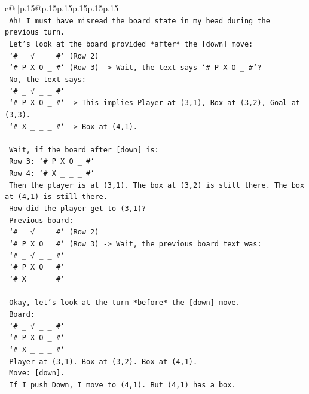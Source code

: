 \documentclass{article}
\begin{document}
{\begin{supertabular}{c@{$\;$}|p{.15\linewidth}@{}p{.15\linewidth}p{.15\linewidth}p{.15\linewidth}p{.15\linewidth}p{.15\linewidth}}
{{{\\ 
\texttt{      Ah! I must have misread the board state in my head during the previous turn.} \\
\texttt{      Let's look at the board provided *after* the {[}down{]} move:} \\
\texttt{      `\# \_ √ \_ \_ \#` (Row 2)} \\
\texttt{      `\# P X O \_ \#` (Row 3) {-}> Wait, the text says `\# P X O \_ \#`?} \\
\texttt{      No, the text says:} \\
\texttt{      `\# \_ √ \_ \_ \#`} \\
\texttt{      `\# P X O \_ \#` {-}> This implies Player at (3,1), Box at (3,2), Goal at (3,3).} \\
\texttt{      `\# X \_ \_ \_ \#` {-}> Box at (4,1).} \\
\\ 
\texttt{      Wait, if the board after {[}down{]} is:} \\
\texttt{      Row 3: `\# P X O \_ \#`} \\
\texttt{      Row 4: `\# X \_ \_ \_ \#`} \\
\texttt{      Then the player is at (3,1). The box at (3,2) is still there. The box at (4,1) is still there.} \\
\texttt{      How did the player get to (3,1)?} \\
\texttt{      Previous board:} \\
\texttt{      `\# \_ √ \_ \_ \#` (Row 2)} \\
\texttt{      `\# P X O \_ \#` (Row 3) {-}> Wait, the previous board text was:} \\
\texttt{      `\# \_ √ \_ \_ \#`} \\
\texttt{      `\# P X O \_ \#`} \\
\texttt{      `\# X \_ \_ \_ \#`} \\
\\ 
\texttt{      Okay, let's look at the turn *before* the {[}down{]} move.} \\
\texttt{      Board:} \\
\texttt{      `\# \_ √ \_ \_ \#`} \\
\texttt{      `\# P X O \_ \#`} \\
\texttt{      `\# X \_ \_ \_ \#`} \\
\texttt{      Player at (3,1). Box at (3,2). Box at (4,1).} \\
\texttt{      Move: {[}down{]}.} \\
\texttt{      If I push Down, I move to (4,1). But (4,1) has a box.} \\
}}}
\end{supertabular}}
\end{document}
